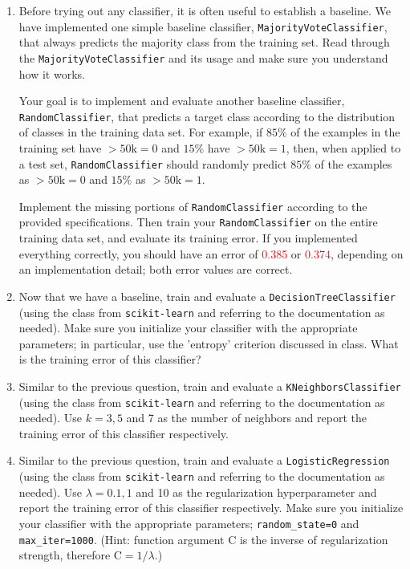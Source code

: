 \documentclass[letterpaper]{article}
\theoremstyle{definition}
\begin{document}
\begin{enumerate}
\begin{enumerate}
\color{black}
\item Before trying out any classifier, it is often useful to
establish a baseline. We have implemented one simple baseline
classifier, \texttt{MajorityVoteClassifier}, that always predicts the
majority class from the training set. Read through the
\texttt{MajorityVoteClassifier} and its usage and make sure you
understand how it works.

Your goal is to implement and evaluate another baseline
classifier, \texttt{RandomClassifier}, that predicts a target class
according to the distribution of classes in the training data
set. For example, if \(85 \%\) of the examples in the training set
have \(>50 \mathrm{k}=0\) and \(15 \%\) have \(>50 \mathrm{k}=1\),
then, when applied to a test set, \texttt{RandomClassifier} should
randomly predict \(85 \%\) of the examples as \(>50 \mathrm{k}=0\)
and \(15 \%\) as \(>50 \mathrm{k}=1\).

Implement the missing portions of \texttt{RandomClassifier} according
to the provided specifications. Then train your
\texttt{RandomClassifier} on the entire training data set, and evaluate
its training error. If you implemented everything correctly, you
should have an error of \textcolor{red}{0.385} or
\textcolor{red}{0.374}, depending on an implementation detail;
both error values are correct.

\item Now that we have a baseline, train and evaluate a
\texttt{DecisionTreeClassifier} (using the class from \texttt{scikit-learn}
and referring to the documentation as needed). Make sure you
initialize your classifier with the appropriate parameters; in
particular, use the 'entropy' criterion discussed in class. What
is the training error of this classifier?

\item Similar to the previous question, train and evaluate a
\texttt{KNeighborsClassifier} (using the class from \texttt{scikit-learn} and
referring to the documentation as needed). Use \(k=3,5\) and 7 as
the number of neighbors and report the training error of this
classifier respectively.

\item Similar to the previous question, train and evaluate a
\texttt{LogisticRegression} (using the class from \texttt{scikit-learn} and
referring to the documentation as needed). Use \(\lambda=0.1,1\)
and 10 as the regularization hyperparameter and report the
training error of this classifier respectively. Make sure you
initialize your classifier with the appropriate parameters;
\texttt{random\_state=0} and \texttt{max\_iter=1000}. (Hint: function argument
\(\mathrm{C}\) is the inverse of regularization strength,
therefore \(\mathrm{C}=1 / \lambda\).)


\end{enumerate}
\end{enumerate}
\end{document}
